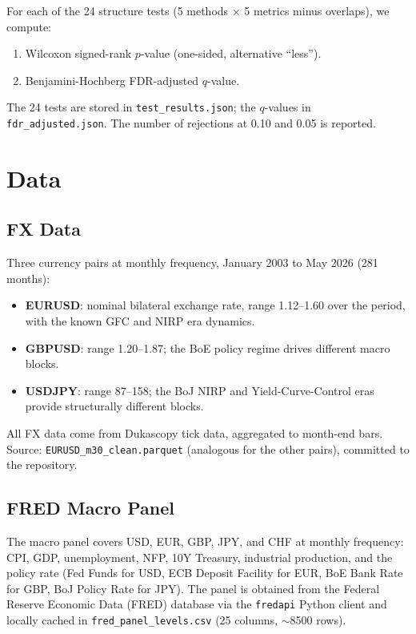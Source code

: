 \documentclass[11pt,a4paper]{article}
\theoremstyle{definition}
\begin{document}
For each of the 24 structure tests (5 methods $\times$ 5 metrics minus overlaps), we compute:
\begin{enumerate}[leftmargin=2em]
  \item Wilcoxon signed-rank $p$-value (one-sided, alternative ``less'').
  \item Benjamini-Hochberg FDR-adjusted $q$-value.
\end{enumerate}

The 24 tests are stored in \texttt{test\_results.json}; the $q$-values in \texttt{fdr\_adjusted.json}. The number of rejections at 0.10 and 0.05 is reported.

\section{Data}
\label{sec:data}

\subsection{FX Data}

Three currency pairs at monthly frequency, January 2003 to May 2026 (281 months):
\begin{itemize}[leftmargin=2em]
  \item \textbf{EURUSD}: nominal bilateral exchange rate, range 1.12--1.60 over the period, with the known GFC and NIRP era dynamics.
  \item \textbf{GBPUSD}: range 1.20--1.87; the BoE policy regime drives different macro blocks.
  \item \textbf{USDJPY}: range 87--158; the BoJ NIRP and Yield-Curve-Control eras provide structurally different blocks.
\end{itemize}

All FX data come from Dukascopy tick data, aggregated to month-end bars. Source: \texttt{EURUSD\_m30\_clean.parquet} (analogous for the other pairs), committed to the repository.

\subsection{FRED Macro Panel}

The macro panel covers USD, EUR, GBP, JPY, and CHF at monthly frequency: CPI, GDP, unemployment, NFP, 10Y Treasury, industrial production, and the policy rate (Fed Funds for USD, ECB Deposit Facility for EUR, BoE Bank Rate for GBP, BoJ Policy Rate for JPY). The panel is obtained from the Federal Reserve Economic Data (FRED) database via the \texttt{fredapi} Python client and locally cached in \texttt{fred\_panel\_levels.csv} (25 columns, $\sim$8500 rows).
\end{document}
